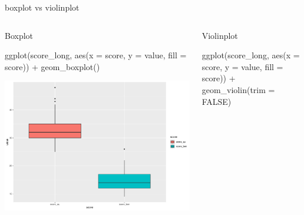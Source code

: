 \documentclass[
  ignorenonframetext,
]{beamer}
\newenvironment{Shaded}{\begin{snugshade}}{\end{snugshade}}
\newcommand{\AttributeTok}[1]{\textcolor[rgb]{0.00,0.34,0.68}{#1}}
\newcommand{\ConstantTok}[1]{\textcolor[rgb]{0.67,0.33,0.00}{#1}}
\newcommand{\FunctionTok}[1]{\textcolor[rgb]{0.39,0.29,0.61}{#1}}
\newcommand{\NormalTok}[1]{\textcolor[rgb]{0.12,0.11,0.11}{#1}}
\newcommand{\SpecialCharTok}[1]{\textcolor[rgb]{0.24,0.68,0.91}{#1}}
\begin{document}
\begin{frame}[fragile]{boxplot vs violinplot}
\protect\hypertarget{boxplot-vs-violinplot}{}
\begin{columns}[T]
\begin{column}{0.48\textwidth}
Boxplot \scriptsize

\begin{Shaded}
\begin{Highlighting}[]
\FunctionTok{ggplot}\NormalTok{(score\_long, }
       \FunctionTok{aes}\NormalTok{(}\AttributeTok{x =}\NormalTok{ score, }\AttributeTok{y =}\NormalTok{ value,}
           \AttributeTok{fill =}\NormalTok{ score)) }\SpecialCharTok{+} 
  \FunctionTok{geom\_boxplot}\NormalTok{()}
\end{Highlighting}
\end{Shaded}

\begin{center}\includegraphics[width=0.7\linewidth]{Practice_files/figure-beamer/unnamed-chunk-76-1} \end{center}
\end{column}

\begin{column}{0.48\textwidth}
Violinplot

\scriptsize

\begin{Shaded}
\begin{Highlighting}[]
\FunctionTok{ggplot}\NormalTok{(score\_long, }
       \FunctionTok{aes}\NormalTok{(}\AttributeTok{x =}\NormalTok{ score, }\AttributeTok{y =}\NormalTok{ value,}
           \AttributeTok{fill =}\NormalTok{ score)) }\SpecialCharTok{+} 
  \FunctionTok{geom\_violin}\NormalTok{(}\AttributeTok{trim =} \ConstantTok{FALSE}\NormalTok{) }
\end{Highlighting}
\end{Shaded}


\end{column}
\end{columns}
\end{frame}
\end{document}

